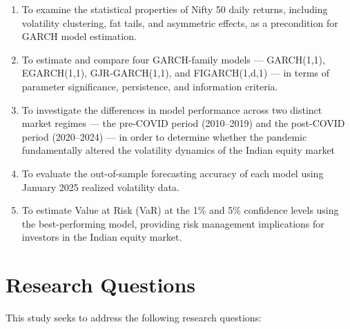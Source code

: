 \begin{enumerate}

\item To examine the statistical properties of Nifty 50 daily returns, including volatility clustering, fat tails, and asymmetric effects, as a precondition for GARCH model estimation.
    
\item To estimate and compare four GARCH-family models — GARCH(1,1), EGARCH(1,1), GJR-GARCH(1,1), and FIGARCH(1,d,1) — in terms of parameter significance, persistence, and information criteria.\\
   

\item To investigate the differences in model performance across two distinct market regimes — the pre-COVID period (2010–2019) and the post-COVID period (2020–2024) — in order to determine whether the pandemic fundamentally altered the volatility dynamics of the Indian equity market\\

\item To evaluate the out-of-sample forecasting accuracy of each model using January 2025 realized volatility data.\\


\item To estimate Value at Risk (VaR) at the 1\% and 5\% confidence levels using the best-performing model, providing risk management implications for investors in the Indian equity market.
\end{enumerate}

\vspace{4cm}
\section{ Research Questions}
This study seeks to address the following research questions:

